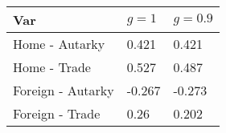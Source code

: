 \begin{tabular}{@{}lll@{}}
    \toprule
    Var               & $g = 1$ & $g = 0.9$ \\ \midrule
    Home - Autarky    & 0.421   & 0.421     \\
    Home - Trade      & 0.527   & 0.487      \\
    Foreign - Autarky & -0.267  & -0.273    \\
    Foreign - Trade   & 0.26   & 0.202   \\ \bottomrule
    \end{tabular}